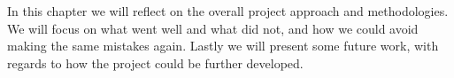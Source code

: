 In this chapter we will reflect on the overall project approach and methodologies. We will focus on what went well and what did not, and how we could avoid making the same mistakes again. Lastly we will present some future work, with regards to how the project could be further developed.